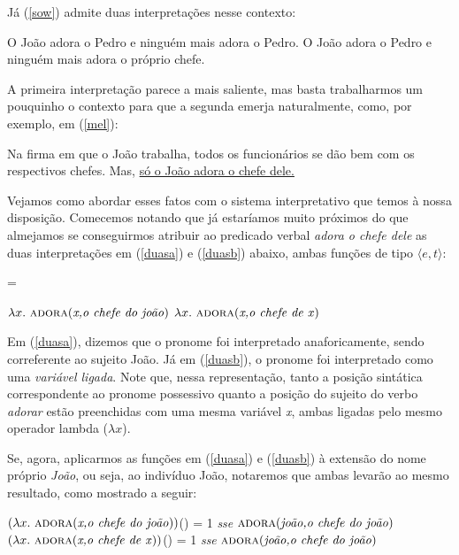 \n Já (\ref{sow}) admite duas interpretações nesse contexto:

\begin{exe}
	\ex O João adora o Pedro e ninguém mais adora o Pedro. \label{so1}
	\ex O João adora o Pedro e ninguém mais adora o próprio
	chefe.  \label{so2}
\end{exe}

\n A primeira interpretação parece a mais saliente, mas basta trabalharmos um pouquinho o contexto para que a segunda emerja naturalmente, como, por exemplo, em (\ref{mel}):

\begin{exe}
	\ex Na firma em que o João trabalha, todos os funcionários se dão bem com os respectivos chefes. Mas, \underline{só o João adora o chefe dele.} \label{mel}
\end{exe}


Vejamos como abordar esses fatos com o sistema interpretativo que temos à nossa disposição. Comecemos notando que já estaríamos muito próximos do que almejamos se conseguirmos atribuir ao predicado verbal \textit{adora o chefe dele} as duas interpretações em (\ref{duasa}) e (\ref{duasb}) abaixo, ambas funções de tipo $\langle e,t\rangle$:

\begin{exe}
\ex {} = \label{duas}
\begin{xlist}
\ex $\lambda x.\ \text{\textsc{adora}(\textit{x,o chefe do joão})}$ \label{duasa}
\ex $\lambda x.\ \text{\textsc{adora}(\textit{x,o chefe de x})}$ \label{duasb}
\end{xlist}
\end{exe}


\n Em (\ref{duasa}), dizemos que o pronome foi interpretado anaforicamente, sendo correferente ao sujeito João. Já em (\ref{duasb}), o pronome foi interpretado como uma \textit{variável ligada}. Note que, nessa representação, tanto a posição sintática correspondente ao pronome possessivo quanto a posição do sujeito do verbo \textit{adorar} estão preenchidas com uma mesma variável \textit{x}, ambas ligadas pelo mesmo operador lambda ($\lambda x$).

Se, agora, aplicarmos as funções em (\ref{duasa}) e (\ref{duasb}) à extensão do nome próprio \textit{João}, ou seja, ao indivíduo João, notaremos que ambas levarão ao mesmo resultado, como mostrado a seguir:

\begin{exe}
	\ex $(\lambda x.\ \text{\textsc{adora}(\textit{x,o chefe do joão})})$() = 1 \textit{sse} $\text{\textsc{adora}(\textit{joão,o chefe do joão})}$ \label{int1}
	\ex $(\lambda x.\ \predica{adora}{x,o chefe de x})$() = 1 \textit{sse} $\text{\textsc{adora}(\textit{joão,o chefe do joão})}$  \label{int2}
\end{exe}

